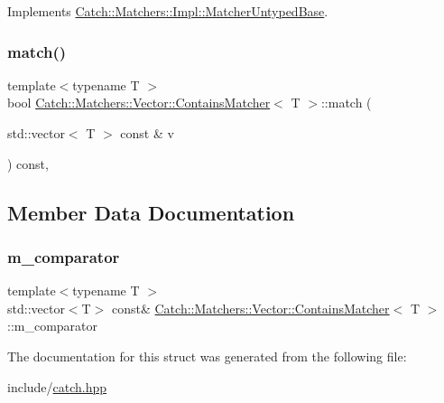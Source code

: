 Implements \mbox{\hyperlink{class_catch_1_1_matchers_1_1_impl_1_1_matcher_untyped_base_a91d3a907dbfcbb596077df24f6e11fe2}{Catch\+::\+Matchers\+::\+Impl\+::\+Matcher\+Untyped\+Base}}.

\mbox{\label{struct_catch_1_1_matchers_1_1_vector_1_1_contains_matcher_afd33467ae48a41a634572b41b053f67f}} 
\subsubsection{\texorpdfstring{match()}{match()}}
{\footnotesize\ttfamily template$<$typename T $>$ \\
bool \mbox{\hyperlink{struct_catch_1_1_matchers_1_1_vector_1_1_contains_matcher}{Catch\+::\+Matchers\+::\+Vector\+::\+Contains\+Matcher}}$<$ T $>$\+::match (\begin{DoxyParamCaption}\item[{std\+::vector$<$ T $>$ const \&}]{v }\end{DoxyParamCaption}) const\hspace{0.3cm}{\ttfamily [inline]}, {\ttfamily [override]}}



\subsection{Member Data Documentation}
\mbox{\label{struct_catch_1_1_matchers_1_1_vector_1_1_contains_matcher_a83d051166e4ed0d535219ad6ee99abb2}} 
\subsubsection{\texorpdfstring{m\_comparator}{m\_comparator}}
{\footnotesize\ttfamily template$<$typename T $>$ \\
std\+::vector$<$T$>$ const\& \mbox{\hyperlink{struct_catch_1_1_matchers_1_1_vector_1_1_contains_matcher}{Catch\+::\+Matchers\+::\+Vector\+::\+Contains\+Matcher}}$<$ T $>$\+::m\+\_\+comparator}



The documentation for this struct was generated from the following file\+:\begin{DoxyCompactItemize}
\item 
include/\mbox{\hyperlink{catch_8hpp}{catch.\+hpp}}\end{DoxyCompactItemize}
